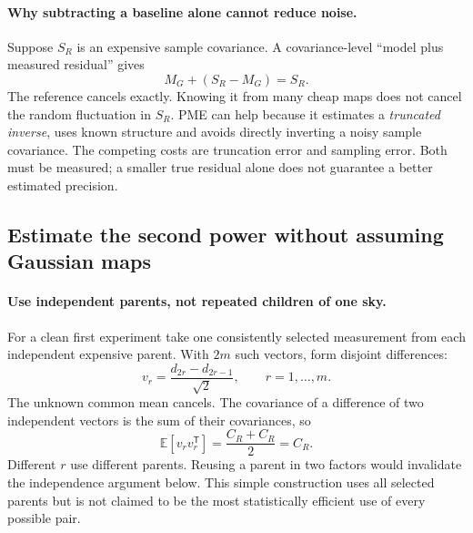 \documentclass[11pt]{article}
\newcommand{\E}{\mathbb{E}}
\begin{document}
\paragraph{Why subtracting a baseline alone cannot reduce noise.}
Suppose $S_R$ is an expensive sample covariance. A covariance-level
``model plus measured residual'' gives
\begin{equation}
 M_G+(S_R-M_G)=S_R.
\end{equation}
The reference cancels exactly. Knowing it from many cheap maps does not
cancel the random fluctuation in $S_R$. PME can help because it estimates
a \emph{truncated inverse}, uses known structure and avoids directly
inverting a noisy sample covariance. The competing costs are truncation
error and sampling error. Both must be measured; a smaller true residual
alone does not guarantee a better estimated precision.

\subsection{Estimate the second power without assuming Gaussian maps}

\paragraph{Use independent parents, not repeated children of one sky.}
For a clean first experiment take one consistently selected measurement
from each independent expensive parent. With $2m$ such vectors, form
disjoint differences:
\begin{equation}
 v_r=\frac{d_{2r}-d_{2r-1}}{\sqrt{2}},\qquad r=1,\ldots,m.
\end{equation}
The unknown common mean cancels. The covariance of a difference of two
independent vectors is the sum of their covariances, so
\begin{equation}
 \E[v_r v_r^{\mathsf T}]=\frac{C_R+C_R}{2}=C_R.
\end{equation}
Different $r$ use different parents. Reusing a parent in two factors would
invalidate the independence argument below. This simple construction uses
all selected parents but is not claimed to be the most statistically
efficient use of every possible pair.
\end{document}
